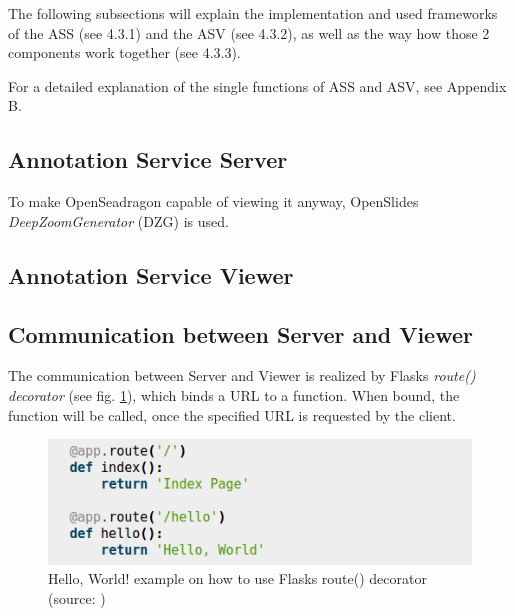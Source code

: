 The following subsections will explain the implementation and used frameworks of the ASS (see 4.3.1) and the ASV (see 4.3.2), as well as the way how those 2 components work together (see 4.3.3).

For a detailed explanation of the single functions of ASS and ASV, see Appendix B.

\subsection{Annotation Service Server}
To make OpenSeadragon capable of viewing it anyway, OpenSlides \emph{DeepZoomGenerator} (DZG) is used. 

\subsection{Annotation Service Viewer}

\subsection{Communication between Server and Viewer}

The communication between Server and Viewer is realized by Flasks \emph{route() decorator} (see fig. \ref{fig4_routeDecorator}), which binds a URL to a function\cite{web:flask}. When bound, the function will be called, once the specified URL is requested by the client.

\begin{figure}[H]
	\begin{center}
		\includegraphics[scale=0.5]{img/route.png}
		\caption{Hello, World! example on how to use Flasks route() decorator (source: \cite{web:flask})}
		\label{fig4_routeDecorator}
	\end{center}
\end{figure}

